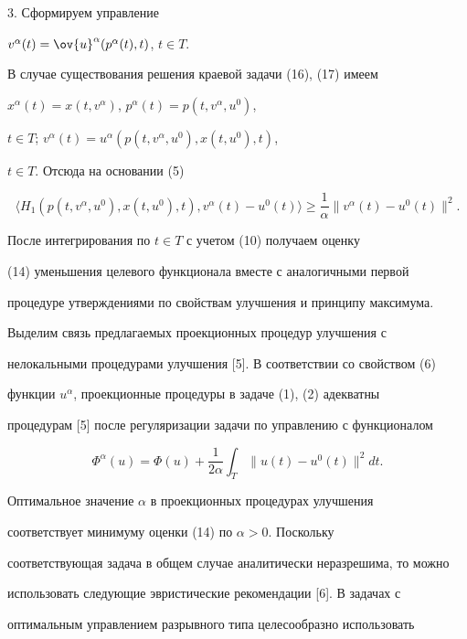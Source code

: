 3. Сформируем управление


$v^{\alpha}(t)=\ov{u}^{\alpha}(p^{\alpha}(t),t)$, ${t}\in{T}$.





В случае существования решения краевой задачи (16), (17) имеем


$x^{\alpha}(t)=x(t,v^{\alpha})$, $p^{\alpha}(t)=p(t,v^{\alpha},u^0)$,


$t\in{T}$; $v^{\alpha}(t)=u^{\alpha}(p(t,v^{\alpha},u^0),x(t,u^0),t)$,


${t}\in{T}$. Отсюда на основании (5)


$$


\langle{H_1}(p(t,v^{\alpha},u^0),x(t,u^0),t),


v^{\alpha}(t)-u^{0}(t)\rangle\geq\frac{1}{\alpha}\|v^{\alpha}(t)-u^{0}(t)\|^2.


$$


После интегрирования по $t\in{T}$ с учетом (10) получаем оценку


(14) уменьшения целевого функционала вместе с аналогичными первой


процедуре утверждениями по свойствам улучшения и принципу максимума.





Выделим связь предлагаемых проекционных процедур улучшения с


нелокальными процедурами улучшения [5]. В соответствии со свойством (6)


функции $u^{\alpha}$, проекционные процедуры в задаче (1), (2) адекватны


процедурам [5] после регуляризации задачи по управлению с функционалом


$$


\Phi^{\alpha}(u)=\Phi(u)+\frac{1}{2\alpha}\int_{T}\|u(t)-u^{0}(t)\|^2dt.


$$





Оптимальное значение $\alpha$ в проекционных процедурах улучшения


соответствует минимуму оценки (14) по $\alpha>0$. Поскольку


соответствующая задача в общем случае аналитически неразрешима, то можно


использовать следующие эвристические рекомендации [6]. В задачах с


оптимальным управлением разрывного типа целесообразно использовать


